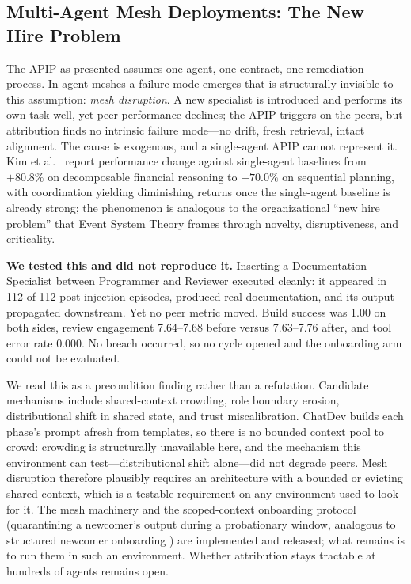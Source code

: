 \documentclass[conference]{IEEEtran}
\begin{document}
\subsection{Multi-Agent Mesh Deployments: The New Hire Problem}
\label{sec:mesh}

The APIP as presented assumes one agent, one contract, one remediation
process. In agent meshes a failure mode emerges that is structurally invisible
to this assumption: \emph{mesh disruption}. A new specialist is introduced and
performs its own task well, yet peer performance declines; the APIP triggers on
the peers, but attribution finds no intrinsic failure mode---no drift, fresh
retrieval, intact alignment. The cause is exogenous, and a single-agent APIP
cannot represent it. Kim et al.\ \cite{kim2025} report performance change
against single-agent baselines from $+80.8\%$ on decomposable financial
reasoning to $-70.0\%$ on sequential planning, with coordination yielding
diminishing returns once the single-agent baseline is already strong; the
phenomenon is analogous to the
organizational ``new hire problem'' that Event System Theory
\cite{morgeson2015} frames through novelty, disruptiveness, and criticality.

\textbf{We tested this and did not reproduce it.} Inserting a Documentation
Specialist between Programmer and Reviewer executed cleanly: it appeared in
112 of 112 post-injection episodes, produced real documentation, and its output
propagated downstream. Yet no peer metric moved. Build success was 1.00 on both
sides, review engagement 7.64--7.68 before versus 7.63--7.76 after, and tool
error rate 0.000. No breach occurred, so no cycle opened and the onboarding arm
could not be evaluated.

We read this as a precondition finding rather than a refutation. Candidate
mechanisms include shared-context crowding, role boundary erosion,
distributional shift in shared state, and trust miscalibration. ChatDev builds
each phase's prompt afresh from templates, so there is no bounded context pool
to crowd: crowding is structurally unavailable here, and the mechanism this
environment can test---distributional shift alone---did not degrade peers. Mesh
disruption therefore plausibly requires an architecture with a bounded or
evicting shared context, which is a testable requirement on any environment
used to look for it. The mesh machinery and the scoped-context onboarding
protocol (quarantining a newcomer's output during a probationary window,
analogous to structured newcomer onboarding \cite{kammeyer2013}) are
implemented and released; what remains is to run them in such an environment.
Whether attribution stays tractable at hundreds of agents remains open.
\end{document}
